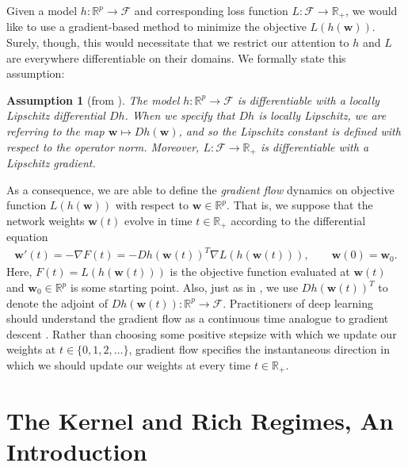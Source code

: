 \documentclass{article}
\newtheorem*{assumption}{Assumption}
\begin{document}
Given a model $h: \mathbb{R}^p \rightarrow \mathcal{F}$ and corresponding loss function $L: \mathcal{F} \rightarrow \mathbb{R}_+$, we would like to use a gradient-based method to minimize the objective $L(h(\boldsymbol{w}))$. Surely, though, this would necessitate that we restrict our attention to $h$ and $L$ are everywhere differentiable on their domains. We formally state this assumption:
\begin{assumption}[from \cite{chizat2018lazy}]\label{assumption1}
The model $h: \mathbb{R}^p \rightarrow \mathcal{F}$ is differentiable with a locally Lipschitz differential $Dh$. When we specify that $Dh$ is locally Lipschitz, we are referring to the map $\boldsymbol{w} \mapsto Dh(\boldsymbol{w})$, and so the Lipschitz constant is defined with respect to the operator norm. Moreover, $L: \mathcal{F} \rightarrow \mathbb{R}_+$ is differentiable with a Lipschitz gradient.
\end{assumption}
As a consequence, we are able to define the \textit{gradient flow} dynamics on objective function $L(h(\boldsymbol{w}))$ with respect to $\boldsymbol{w} \in \mathbb{R}^p$. That is, we suppose that the network weights $\boldsymbol{w}(t)$ evolve in time $t \in \mathbb{R}_+$ according to the differential equation
\begin{align*}
    \boldsymbol{w}'(t) = -\nabla F(t) = - Dh(\boldsymbol{w}(t))^T \nabla L(h(\boldsymbol{w}(t))), \qquad \boldsymbol{w}(0) = \boldsymbol{w}_0.
\end{align*}
Here, $F(t) = L(h(\boldsymbol{w}(t)))$ is the objective function evaluated at $\boldsymbol{w}(t)$ and $\boldsymbol{w}_0 \in \mathbb{R}^p$ is some starting point. Also, just as in \cite{chizat2018lazy}, we use $Dh(\boldsymbol{w}(t))^T$ to denote the adjoint of $Dh(\boldsymbol{w}(t)): \mathbb{R}^p \rightarrow \mathcal{F}$. Practitioners of deep learning should understand the gradient flow as a continuous time analogue to gradient descent \cite{wibisono2016}. Rather than choosing some positive stepsize with which we update our weights at $t \in \{0, 1, 2, \ldots \}$, gradient flow specifies the instantaneous direction in which we should update our weights at every time $t \in \mathbb{R}_+$.

\section{The Kernel and Rich Regimes, An Introduction}\label{richkernel}
\end{document}
